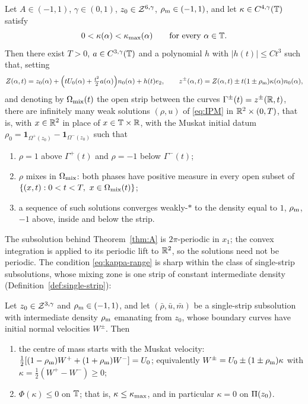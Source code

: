\begin{theorem}\label{thm:A}
Let $A\in(-1,1)$, $\gamma\in(0,1)$, $z_0\in\mathcal{Z}^{6,\gamma}$, $\rho_{\mathrm m}\in(-1,1)$, and let $\kappa\in C^{4,\gamma}(\mathbb{T})$ satisfy
\begin{equation}\label{eq:kappa-range}
0<\kappa(\alpha)<\kappa_{\max}(\alpha)\qquad\text{for every }\alpha\in\mathbb{T} .
\end{equation}
Then there exist $T>0$, $a\in C^{3,\gamma}(\mathbb{T})$ and a polynomial $h$ with $|h(t)|\le Ct^3$ such that, setting
\begin{equation}\label{eq:central}
Z(\alpha,t)=z_0(\alpha)+\Big(tU_0(\alpha)+\tfrac{t^2}{2}a(\alpha)\Big)n_0(\alpha)+h(t)e_2,\qquad z^\pm(\alpha,t)=Z(\alpha,t)\pm t(1\pm\rho_{\mathrm m})\kappa(\alpha)n_0(\alpha),
\end{equation}
and denoting by $\Omega_{\rm mix}(t)$ the open strip between the curves $\Gamma^\pm(t)=z^\pm(\mathbb{R},t)$, there are infinitely many weak solutions $(\rho,u)$ of \eqref{eq:IPM} in $\mathbb{R}^2\times(0,T)$,
that is, with $x\in\mathbb{R}^2$ in place of $x\in\mathbb{T}\times\mathbb{R}$, with the Muskat initial datum $\rho_0=\mathbf 1_{\Omega^+(z_0)}-\mathbf 1_{\Omega^-(z_0)}$ such that
\begin{enumerate}[label=\textup{(\roman*)}]
\item $\rho=1$ above $\Gamma^+(t)$ and $\rho=-1$ below $\Gamma^-(t)$;
\item $\rho$ mixes in $\Omega_{\rm mix}$: both phases have positive measure in every open subset of $\{(x,t):0<t<T,\ x\in\Omega_{\rm mix}(t)\}$;
\item a sequence of such solutions converges weakly-$*$ to the density equal to $1$, $\rho_{\mathrm m}$, $-1$ above, inside and below the strip.
\end{enumerate}
\end{theorem}

The subsolution behind Theorem~\ref{thm:A} is $2\pi$-periodic in $x_1$; the convex integration is applied to its periodic lift to $\mathbb{R}^2$, so the solutions need not be periodic.
The condition \eqref{eq:kappa-range} is sharp within the class of single-strip subsolutions, whose mixing zone is one strip of constant intermediate density (Definition~\ref{def:single-strip}):

\begin{theorem}\label{thm:B}
Let $z_0\in\mathcal{Z}^{3,\gamma}$ and $\rho_{\mathrm m}\in(-1,1)$, and let $(\bar\rho,\bar u,\bar m)$ be a single-strip subsolution with intermediate density $\rho_{\mathrm m}$ emanating from $z_0$, whose boundary curves have initial
normal velocities $W^\pm$. Then
\begin{enumerate}[label=\textup{(\alph*)}]
\item the centre of mass starts with the Muskat velocity: $\frac12[(1-\rho_{\mathrm m})W^++(1+\rho_{\mathrm m})W^-]=U_0$; equivalently $W^\pm=U_0\pm(1\pm\rho_{\mathrm m})\kappa$ with $\kappa=\frac12(W^+-W^-)\ge0$;
\item $\Phi(\kappa)\le0$ on $\mathbb{T}$; that is, $\kappa\le\kappa_{\max}$, and in particular $\kappa=0$ on $\Pi(z_0)$.
\end{enumerate}
\end{theorem}

